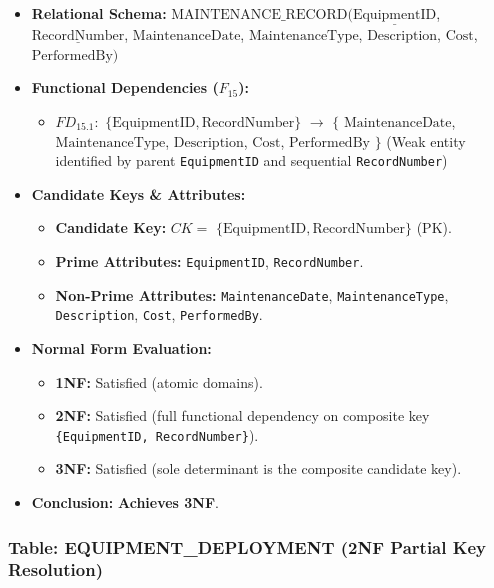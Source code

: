 \documentclass[a4paper,12pt]{report}
\providecommand{\tightlist}{%
  \setlength{\itemsep}{0pt}\setlength{\parskip}{0pt}}
\begin{document}
\begin{itemize}
\item
  \textbf{Relational Schema:} \(\text{MAINTENANCE\_RECORD}(\underline{\text{EquipmentID}}\), \(\underline{\text{RecordNumber}}\), \(\text{MaintenanceDate}\), \(\text{MaintenanceType}\), \(\text{Description}\), \(\text{Cost}\), \(\text{PerformedBy})\)
\item
  \textbf{Functional Dependencies (\(F_{15}\)):}

  \begin{itemize}
  \tightlist
  \item
    \(FD_{15.1}:\) \(\{\text{EquipmentID}, \text{RecordNumber}\}\) \(\rightarrow\) \(\{\) \(\text{MaintenanceDate}\), \(\text{MaintenanceType}\), \(\text{Description}\), \(\text{Cost}\), \(\text{PerformedBy}\) \(\}\) (Weak entity identified by parent \texttt{EquipmentID} and sequential \texttt{RecordNumber})
  \end{itemize}
\item
  \textbf{Candidate Keys \& Attributes:}

  \begin{itemize}
  \item
    \textbf{Candidate Key:} \(CK =\) \(\{\text{EquipmentID}, \text{RecordNumber}\}\) (PK).
  \item
    \textbf{Prime Attributes:} \texttt{EquipmentID}, \texttt{RecordNumber}.
  \item
    \textbf{Non-Prime Attributes:} \texttt{MaintenanceDate}, \texttt{MaintenanceType}, \texttt{Description}, \texttt{Cost}, \texttt{PerformedBy}.
  \end{itemize}
\item
  \textbf{Normal Form Evaluation:}

  \begin{itemize}
  \item
    \textbf{1NF:} Satisfied (atomic domains).
  \item
    \textbf{2NF:} Satisfied (full functional dependency on composite key \texttt{\{EquipmentID, RecordNumber\}}).
  \item
    \textbf{3NF:} Satisfied (sole determinant is the composite candidate key).
  \end{itemize}
\item
  \textbf{Conclusion:} \textbf{Achieves 3NF}.
\end{itemize}

\subsubsection{\texorpdfstring{Table: EQUIPMENT\_\allowbreak{}DEPLOYMENT (2NF Partial Key Resolution)}{Table: EQUIPMENTDEPLOYMENT (2NF Partial Key Resolution)}}\label{table-equipment_deployment-2nf-partial-key-resolution}
\end{document}
